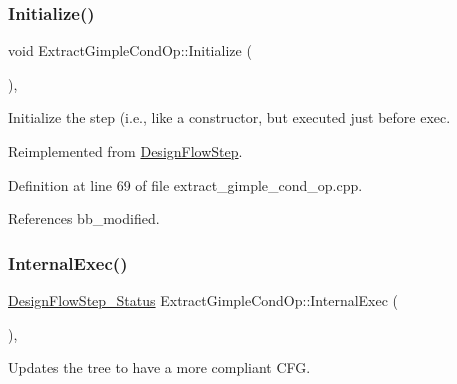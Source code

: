 \mbox{\label{classExtractGimpleCondOp_aa5ad36991f470b0fae011ed6d5c77094}} 
\subsubsection{\texorpdfstring{Initialize()}{Initialize()}}
{\footnotesize\ttfamily void Extract\+Gimple\+Cond\+Op\+::\+Initialize (\begin{DoxyParamCaption}{ }\end{DoxyParamCaption})\hspace{0.3cm}{\ttfamily [override]}, {\ttfamily [virtual]}}



Initialize the step (i.\+e., like a constructor, but executed just before exec. 



Reimplemented from \hyperlink{classDesignFlowStep_a44b50683382a094976e1d432a7784799}{Design\+Flow\+Step}.



Definition at line 69 of file extract\+\_\+gimple\+\_\+cond\+\_\+op.\+cpp.



References bb\+\_\+modified.

\mbox{\label{classExtractGimpleCondOp_a13ce7e78bf548c98b3ed74e92d77df30}} 
\subsubsection{\texorpdfstring{Internal\+Exec()}{InternalExec()}}
{\footnotesize\ttfamily \hyperlink{design__flow__step_8hpp_afb1f0d73069c26076b8d31dbc8ebecdf}{Design\+Flow\+Step\+\_\+\+Status} Extract\+Gimple\+Cond\+Op\+::\+Internal\+Exec (\begin{DoxyParamCaption}{ }\end{DoxyParamCaption})\hspace{0.3cm}{\ttfamily [override]}, {\ttfamily [virtual]}}



Updates the tree to have a more compliant C\+FG. 


